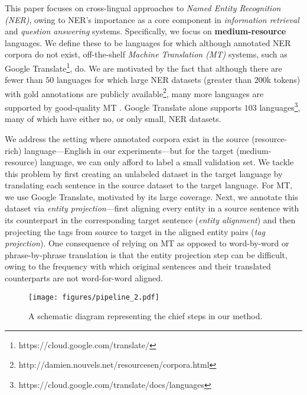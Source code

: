 \documentclass[11pt,a4paper]{article}
\begin{document}
This paper focuses on cross-lingual approaches 
to \emph{Named Entity Recognition (NER)},
owing to 
NER's importance as a core component
in \emph{information retrieval} and \emph{question answering} systems. 
Specifically, we focus on \textbf{medium-resource} languages.
We define these to be languages 
for which although annotated NER corpora do not exist, 
off-the-shelf \emph{Machine Translation (MT)} systems, 
such as Google Translate\footnote{https://cloud.google.com/translate/}, do. 
We are motivated by the fact that although there are fewer than $50$ languages for which large NER datasets (greater than $200$k tokens) 
with gold annotations are publicly available\footnote{http://damien.nouvels.net/resourcesen/corpora.html}, 
many more languages are supported by good-quality MT  \citep{wu2016google}.
Google Translate alone supports $103$ languages\footnote{https://cloud.google.com/translate/docs/languages}, 
many of which have either no, or only small, NER datasets. 












We address the setting where
annotated corpora exist in the source 
(resource-rich) language---English in our experiments---but for the target (medium-resource) language, 
we can only afford to label a small validation set. 
We tackle this problem by first creating 
an unlabeled dataset in the target language 
by translating each sentence in the source dataset to the target language. 
For MT, we use Google Translate,
motivated by its large coverage. 
Next, we annotate this dataset 
via
\emph{entity projection}---first aligning every entity in a source sentence 
with its counterpart in the corresponding target sentence 
(\textit{entity alignment}) 
and then projecting the tags from source to target 
in the aligned entity pairs (\textit{tag projection}). 
One consequence of 
relying on MT
as opposed to word-by-word or phrase-by-phrase translation
is that the entity projection step can be difficult, 
owing to the frequency with which original sentences
and their translated counterparts are not word-for-word aligned.


\begin{figure*}[ht!]
    \centering
    \texttt{[image: figures/pipeline\_2.pdf]}
    \caption{A schematic diagram representing the chief steps in our method.}
\label{fig:pipeline}
\end{figure*}
\end{document}
